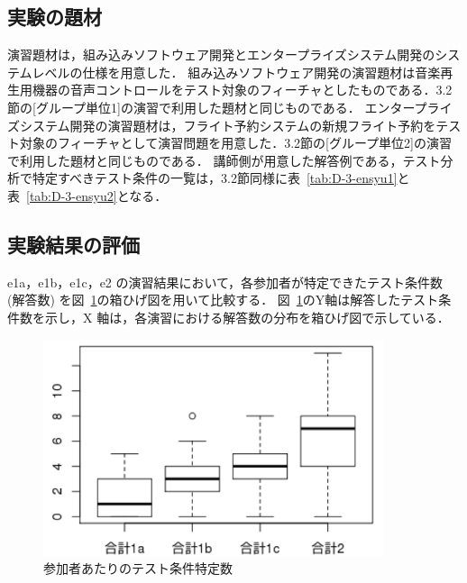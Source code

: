 \subsection{実験の題材}
演習題材は，組み込みソフトウェア開発とエンタープライズシステム開発のシステムレベルの仕様を用意した．
組み込みソフトウェア開発の演習題材は音楽再生用機器の音声コントロールをテスト対象のフィーチャとしたものである．3.2節の[グループ単位1]の演習で利用した題材と同じものである．
エンタープライズシステム開発の演習題材は，フライト予約システムの新規フライト予約をテスト対象のフィーチャとして演習問題を用意した．3.2節の[グループ単位2]の演習で利用した題材と同じものである．
講師側が用意した解答例である，テスト分析で特定すべきテスト条件の一覧は，3.2節同様に表~\ref{tab:D-3-ensyu1}と表~\ref{tab:D-3-ensyu2}となる．


\subsection{実験結果の評価} \label{sec:3-2}
e1a，e1b，e1c，e2 の演習結果において，各参加者が特定できたテスト条件数 (解答数) を図~\ref{fig:D-3-Fig10}の箱ひげ図を用いて比較する．
図~\ref{fig:D-3-Fig10}のY軸は解答したテスト条件数を示し，X 軸は，各演習における解答数の分布を箱ひげ図で示している．

\begin{figure}[htbp]
  \begin{center}
  \includegraphics[width=10cm]{./image/D-3-Fig10.png}
  \caption{参加者あたりのテスト条件特定数}
  \label{fig:D-3-Fig10}
  \end{center}
\end{figure}

